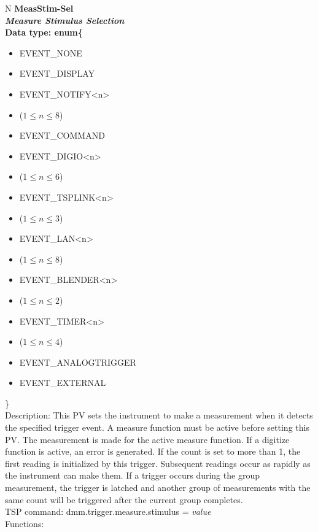 \documentclass[openany]{article}
\begin{document}
		\begin{tabular}{N}
			\hline
			\bfseries MeasStim-Sel\label{pv:measstim-sel} \\ \hline
			\emph{Measure Stimulus Selection} \\
			Data type: enum\{\begin{itemize}[noitemsep]
				\small
				\item[] EVENT\_NONE
				\item[] EVENT\_DISPLAY
				\item[] EVENT\_NOTIFY\textless n\textgreater
				\item[] ($1\leq n\leq 8$)
				\item[] EVENT\_COMMAND
				\item[] EVENT\_DIGIO\textless n\textgreater
				\item[] ($1\leq n\leq 6$)
				\item[] EVENT\_TSPLINK\textless n\textgreater
				\item[] ($1\leq n\leq 3$)
				\item[] EVENT\_LAN\textless n\textgreater
				\item[] ($1\leq n\leq 8$)
				\item[] EVENT\_BLENDER\textless n\textgreater 
				\item[] ($1\leq n\leq 2$)
				\item[] EVENT\_TIMER\textless n\textgreater
				\item[] ($1\leq n\leq 4$)
				\item[] EVENT\_ANALOGTRIGGER
				\item[] EVENT\_EXTERNAL
			\end{itemize}\} \\
			Description: This PV sets the instrument to make a measurement when it detects the specified trigger event. A measure function must be active before setting this PV. The measurement is made for the active measure function. If a digitize function is active, an error is generated. If the count is set to more than 1, the first reading is initialized by this trigger. Subsequent readings occur as rapidly as the instrument can make them. If a trigger occurs during the group measurement, the trigger is latched and another group of measurements with the same count will be triggered after the current group completes. \\
			TSP command: dmm.trigger.measure.stimulus = \emph{value} \\
			Functions: \\
			\arrayrulecolor{\FuncTableBorderColor}


\end{tabular}
\end{document}
